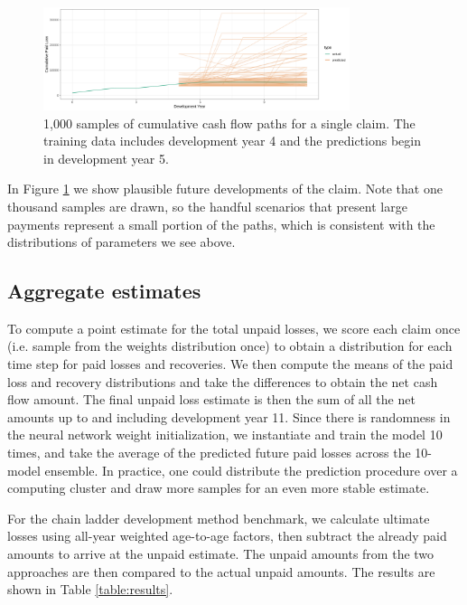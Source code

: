 \documentclass{article}
\begin{document}
\begin{figure}
  \begin{center}
    \includegraphics[width=0.8\textwidth]{images/claim_paths.png}
  \end{center}
  \caption{1,000 samples of cumulative cash flow paths for a single claim. The training data includes development year 4 and the predictions begin in development year 5.}
  \label{fig:claim_paths}
\end{figure}

In Figure \ref{fig:claim_paths} we show plausible future developments of the claim. Note that one thousand samples are drawn, so the handful scenarios that present large payments represent a small portion of the paths, which is consistent with the distributions of parameters we see above.

\subsection{Aggregate estimates}

To compute a point estimate for the total unpaid losses, we score each claim once (i.e. sample from the weights distribution once) to obtain a distribution for each time step for paid losses and recoveries. We then compute the means of the paid loss and recovery distributions and take the differences to obtain the net cash flow amount. The final unpaid loss estimate is then the sum of all the net amounts up to and including development year 11. Since there is randomness in the neural network weight initialization, we instantiate and train the model 10 times, and take the average of the predicted future paid losses across the 10-model ensemble. In practice, one could distribute the prediction procedure over a computing cluster and draw more samples for an even more stable estimate.

For the chain ladder development method benchmark, we calculate ultimate losses using all-year weighted age-to-age factors, then subtract the already paid amounts to arrive at the unpaid estimate. The unpaid amounts from the two approaches are then compared to the actual unpaid amounts. The results are shown in Table \ref{table:results}.
\end{document}
